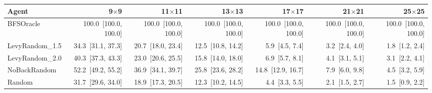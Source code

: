 \begin{tabular}{lrrrrrr}
\toprule
Agent & 9$\times$9 & 11$\times$11 & 13$\times$13 & 17$\times$17 & 21$\times$21 & 25$\times$25 \\
\midrule
BFSOracle & 100.0~[100.0, 100.0] & 100.0~[100.0, 100.0] & 100.0~[100.0, 100.0] & 100.0~[100.0, 100.0] & 100.0~[100.0, 100.0] & 100.0~[100.0, 100.0] \\
LevyRandom_1.5 & 34.3~[31.1, 37.3] & 20.7~[18.0, 23.4] & 12.5~[10.8, 14.2] & 5.9~[4.5, 7.4] & 3.2~[2.4, 4.0] & 1.8~[1.2, 2.4] \\
LevyRandom_2.0 & 40.3~[37.3, 43.3] & 23.0~[20.6, 25.5] & 15.8~[14.0, 18.0] & 6.9~[5.7, 8.1] & 4.1~[3.1, 5.1] & 3.1~[2.2, 4.1] \\
NoBackRandom & 52.2~[49.2, 55.2] & 36.9~[34.1, 39.7] & 25.8~[23.6, 28.2] & 14.8~[12.9, 16.7] & 7.9~[6.0, 9.8] & 4.5~[3.2, 5.9] \\
Random & 31.7~[29.6, 34.0] & 18.9~[17.3, 20.5] & 12.3~[10.2, 14.5] & 4.4~[3.3, 5.5] & 2.1~[1.5, 2.7] & 1.5~[0.9, 2.2] \\
\bottomrule
\end{tabular}